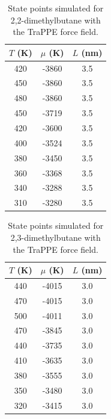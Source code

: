 \documentclass[journal=jctc,manuscript=article]{achemso}
\begin{document}
\begin{table}[htb!]
	\caption{State points simulated for 2,2-dimethylbutane with the TraPPE force field.}
	\begin{center}
		\begin{tabular}{|c|c|c|}
			\hline
			$T$ (K) & $\mu$ (K) & $L$ (nm) \\ \hline
			420	&	-3860	&	3.5	\\
			450	&	-3860	&	3.5	\\
			480	&	-3860	&	3.5	\\
			450	&	-3719	&	3.5	\\
			420	&	-3600	&	3.5	\\
			400	&	-3524	&	3.5	\\
			380	&	-3450	&	3.5	\\
			360	&	-3368	&	3.5	\\
			340	&	-3288	&	3.5	\\
			310	&	-3280	&	3.5	\\
			\hline
		\end{tabular}
	\end{center}
\end{table}

\begin{table}[htb!]
	\caption{State points simulated for 2,3-dimethylbutane with the TraPPE force field.}
	\begin{center}
		\begin{tabular}{|c|c|c|}
			\hline
			$T$ (K) & $\mu$ (K) & $L$ (nm) \\ \hline
			440	&	-4015	&	3.0	\\
			470	&	-4015	&	3.0	\\
			500	&	-4011	&	3.0	\\
			470	&	-3845	&	3.0	\\
			440	&	-3735	&	3.0	\\
			410	&	-3635	&	3.0	\\
			380	&	-3555	&	3.0	\\
			350	&	-3480	&	3.0	\\
			320	&	-3415	&	3.0	\\
			\hline
		\end{tabular}
	\end{center}
\end{table}
\end{document}
